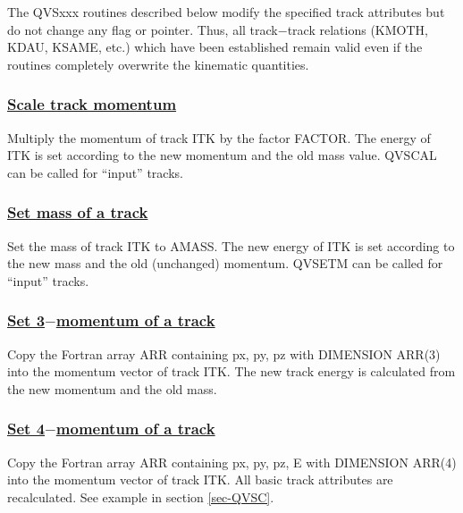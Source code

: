 The QVSxxx routines described below
modify the specified track attributes but do not
change any flag or pointer. Thus, all track$-$track relations (KMOTH,
KDAU, KSAME, etc.) which have been
established remain valid even if the routines
completely overwrite the kinematic quantities.
\par
\subsubsection{\underline{Scale track momentum}}
\par
{}
\par
Multiply the momentum of track ITK by the factor FACTOR. The energy
of ITK is set according to the new momentum and the old mass value.
QVSCAL can be called for ``input'' tracks.
\par
\subsubsection{\underline{Set mass of a track}}
\par
{}
\par
\par
Set the mass of track ITK to AMASS. The new energy of ITK is set
according to the new mass and the old (unchanged) momentum. QVSETM
can be called for ``input'' tracks.
\par
\subsubsection{\underline{Set 3$-$momentum of a track}}
\par
{}
\par
\par
Copy the Fortran array ARR containing px, py, pz with
DIMENSION ARR(3) into the momentum vector of track ITK. The new track
energy is calculated from the new momentum and the old mass.
\subsubsection{\underline{Set 4$-$momentum of a track}}
\par
{}
\par
\par
Copy the Fortran array ARR containing px, py, pz, E with
DIMENSION ARR(4) into the momentum vector of track ITK. All basic
track attributes are recalculated. See example in section
\ref{sec-QVSC}.
\par
